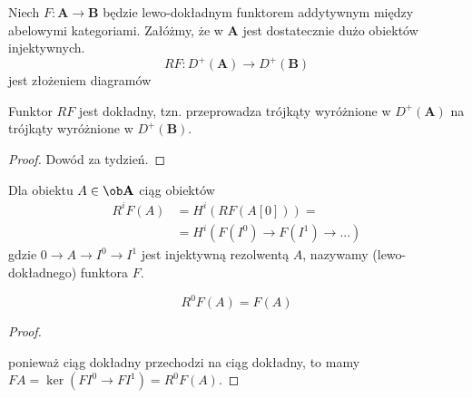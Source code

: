 \begin{definition}
  Niech $F:\mathbf{A}\to\mathbf{B}$ będzie lewo-dokładnym funktorem addytywnym między abelowymi kategoriami. Załóżmy, że w $\mathbf{A}$ jest dostatecznie dużo obiektów injektywnych. 
  $$RF:D^+(\mathbf{A})\to D^+(\mathbf{B})$$
  jest złożeniem diagramów
  \begin{center}\end{center}
\end{definition}

\begin{fact}\label{RF dokladny}
  Funktor $RF$ jest dokładny, tzn. przeprowadza trójkąty wyróżnione w $D^+(\mathbf{A})$ na trójkąty wyróżnione w $D^+(\mathbf{B})$.
\end{fact}
\begin{proof}
  Dowód za tydzień.
\end{proof}

\begin{definition}
  Dla obiektu $A\in\ob\mathbf{A}$ ciąg obiektów
  \begin{align*}
    R^iF(A)&=H^i(RF(A[0]))=\\ 
           &=H^i(F(I^0)\to F(I^1)\to ...)
  \end{align*}
  gdzie $0\to A\to I^0\to I^1$ jest injektywną rezolwentą $A$, nazywamy  (lewo-dokładnego) funktora $F$.
\end{definition}

\begin{uwaga}
  $$R^0F(A)=F(A)$$
\end{uwaga}

\begin{proof}
  \begin{center}\end{center}
  ponieważ ciąg dokładny przechodzi na ciąg dokładny, to mamy $FA=\ker (FI^0\to FI^1)=R^0F(A)$.
\end{proof}

